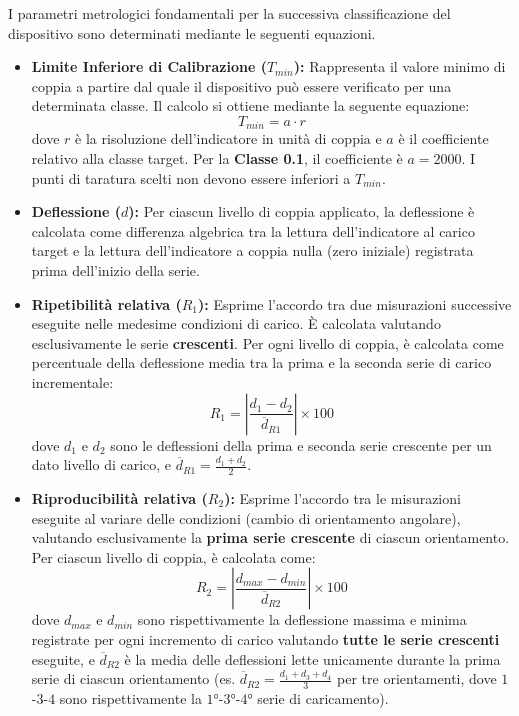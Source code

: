 \documentclass[a4paper, twoside]{article}
\begin{document}
I parametri metrologici fondamentali per la successiva classificazione del dispositivo sono determinati mediante le seguenti equazioni.

\begin{itemize}
    \item \textbf{Limite Inferiore di Calibrazione ($T_{min}$):} Rappresenta il valore minimo di coppia a partire dal quale il dispositivo può essere verificato per una determinata classe. Il calcolo si ottiene mediante la seguente equazione:
    \begin{equation}
        T_{min} = a \cdot r
    \end{equation}
    dove $r$ è la risoluzione dell'indicatore in unità di coppia e $a$ è il coefficiente relativo alla classe target. Per la \textbf{Classe 0.1}, il coefficiente è $a = 2000$. I punti di taratura scelti non devono essere inferiori a $T_{min}$.

    \item \textbf{Deflessione ($d$):} Per ciascun livello di coppia applicato, la deflessione è calcolata come differenza algebrica tra la lettura dell'indicatore al carico target e la lettura dell'indicatore a coppia nulla (zero iniziale) registrata prima dell'inizio della serie.

    \item \textbf{Ripetibilità relativa ($R_1$):} Esprime l'accordo tra due misurazioni successive eseguite nelle medesime condizioni di carico. È calcolata valutando esclusivamente le serie \textbf{crescenti}. Per ogni livello di coppia, è calcolata come percentuale della deflessione media tra la prima e la seconda serie di carico incrementale:
    \begin{equation}
        R_1 = \left| \frac{d_1 - d_2}{\overline{d}_{R1}} \right| \times 100
    \end{equation}
    dove $d_1$ e $d_2$ sono le deflessioni della prima e seconda serie crescente per un dato livello di carico, e $\overline{d}_{R1} = \frac{d_1 + d_2}{2}$.

    \item \textbf{Riproducibilità relativa ($R_2$):} Esprime l'accordo tra le misurazioni eseguite al variare delle condizioni (cambio di orientamento angolare), valutando esclusivamente la \textbf{prima serie crescente} di ciascun orientamento. Per ciascun livello di coppia, è calcolata come:
    \begin{equation}
        R_2 = \left| \frac{d_{max} - d_{min}}{\overline{d}_{R2}} \right| \times 100
    \end{equation}
    dove $d_{max}$ e $d_{min}$ sono rispettivamente la deflessione massima e minima registrate per ogni incremento di carico valutando \textbf{tutte le serie crescenti} eseguite, e $\overline{d}_{R2}$ è la media delle deflessioni lette unicamente durante la prima serie di ciascun orientamento (es. $\overline{d}_{R2} = \frac{d_1 + d_3 + d_4}{3}$ per tre orientamenti, dove $1$-$3$-$4$ sono rispettivamente la $1$°-$3$°-$4$° serie di caricamento).


\end{itemize}
\end{document}
